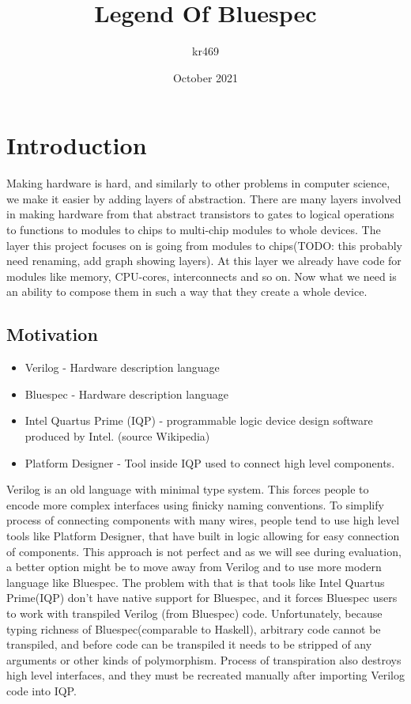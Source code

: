 \documentclass[14pt]{report}
\title{Legend Of Bluespec}
\author{kr469 }
\date{October 2021}
\begin{document}
\maketitle
\tableofcontents

\chapter{Introduction}

Making hardware is hard, and similarly to other problems in computer science, we make it easier by adding layers of abstraction. There are many layers involved in making hardware from that abstract transistors to gates to logical operations to functions to modules to chips to multi-chip modules to whole devices. The layer this project focuses on is going from modules to chips(TODO: this probably need renaming, add graph showing layers). At this layer we already have code for modules like memory, CPU-cores, interconnects and so on. Now what we need is an ability to compose them in such a way that they create a whole device.

\section{Motivation}
\begin{tcolorbox}[title=Vocabulary]
    \begin{itemize}
        \item Verilog - Hardware description language
        \item Bluespec - Hardware description language
        \item Intel Quartus Prime (IQP) - programmable logic device design software produced by Intel. (source Wikipedia)
        \item Platform Designer - Tool inside IQP used to connect high level components.
    \end{itemize}
\end{tcolorbox}
Verilog is an old language with minimal type system. This forces people to encode more complex interfaces using finicky naming conventions. To simplify process of connecting components with many wires, people tend to use high level tools like Platform Designer, that have built in logic allowing for easy connection of components. This approach is not perfect and as we will see during evaluation, a better option might be to move away from Verilog and to use more modern language like Bluespec. The problem with that is that tools like Intel Quartus Prime(IQP) don't have native support for Bluespec, and it forces Bluespec users to work with transpiled Verilog (from Bluespec) code. Unfortunately, because typing richness of Bluespec(comparable to Haskell), arbitrary code cannot be transpiled, and before code can be transpiled it needs to be stripped of any arguments or other kinds of polymorphism. Process of transpiration also destroys high level interfaces, and they must be recreated manually after importing Verilog code into IQP. 
\end{document}
